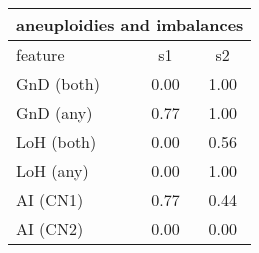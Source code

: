 \documentclass{standalone}
\begin{document}
\begin{tabular}{|l|c|c|}
\hline
\multicolumn{3}{|c|}{\textbf{aneuploidies and imbalances}}\\
\hline 

feature & s1 & s2 \\
\hline
GnD (both) & 0.00 & 1.00 \\
GnD (any) & 0.77 & 1.00 \\
LoH (both) & 0.00 & 0.56 \\
LoH (any) & 0.00 & 1.00 \\
AI (CN1) & 0.77 & 0.44 \\
AI (CN2) & 0.00 & 0.00 \\
\hline
\end{tabular}
\end{document}
